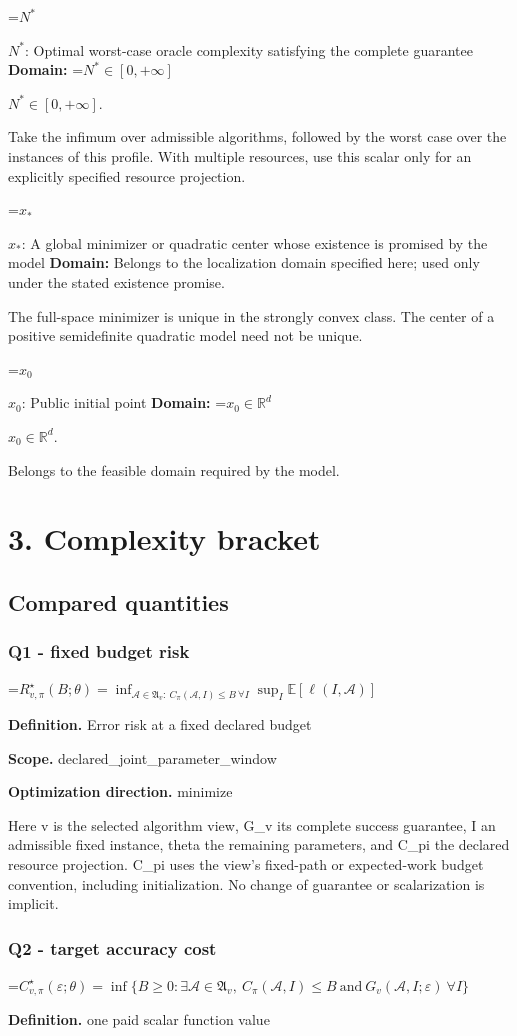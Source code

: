 \documentclass[10pt,a4paper]{article}
\newcommand{\AtlasMath}[1]{\par\begingroup\centering\setbox0=\hbox{$\displaystyle #1$}\ifdim\wd0>1.4\linewidth\typeout{ATLAS WIDE FORMULA: \the\wd0}\fi\ifdim\wd0>\linewidth\resizebox{\linewidth}{!}{\box0}\else\box0\fi\par\endgroup}
\newcommand{\AtlasInlineMath}[1]{\begingroup\setbox0=\hbox{$#1$}\ifdim\wd0>.4\linewidth\endgroup\AtlasMath{#1}\else\endgroup$#1$\fi}
\begin{document}
\AtlasInlineMath{N^*}: Optimal worst-case oracle complexity satisfying the complete guarantee \textbf{Domain:} \AtlasInlineMath{N^*\in[0,+\infty]}.

Take the infimum over admissible algorithms, followed by the worst case over the instances of this profile. With multiple resources, use this scalar only for an explicitly specified resource projection.

\AtlasInlineMath{x_*}: A global minimizer or quadratic center whose existence is promised by the model \textbf{Domain:} Belongs to the localization domain specified here; used only under the stated existence promise.

The full-space minimizer is unique in the strongly convex class. The center of a positive semidefinite quadratic model need not be unique.

\AtlasInlineMath{x_0}: Public initial point \textbf{Domain:} \AtlasInlineMath{x_0\in\mathbb{R}^d}.

Belongs to the feasible domain required by the model.

\section{3. Complexity bracket}
\subsection{Compared quantities}
\subsubsection{Q1 - fixed budget risk}
\AtlasMath{R^\star_{v,\pi}(B;\theta)=\inf_{\mathcal A\in\mathfrak A_v:\ C_\pi(\mathcal A,I)\le B\ \forall I}\sup_I\mathbb E[\ell(I,\mathcal A)]}
\textbf{Definition.} Error risk at a fixed declared budget

\textbf{Scope.} declared\_joint\_parameter\_window

\textbf{Optimization direction.} minimize

Here v is the selected algorithm view, G\_v its complete success guarantee, I an admissible fixed instance, theta the remaining parameters, and C\_pi the declared resource projection. C\_pi uses the view's fixed-path or expected-work budget convention, including initialization. No change of guarantee or scalarization is implicit.

\subsubsection{Q2 - target accuracy cost}
\AtlasMath{C^\star_{v,\pi}(\varepsilon;\theta)=\inf\{B\ge0:\exists\mathcal A\in\mathfrak A_v,\ C_\pi(\mathcal A,I)\le B\ \text{and}\ G_v(\mathcal A,I;\varepsilon)\ \forall I\}}
\textbf{Definition.} one paid scalar function value
\end{document}
